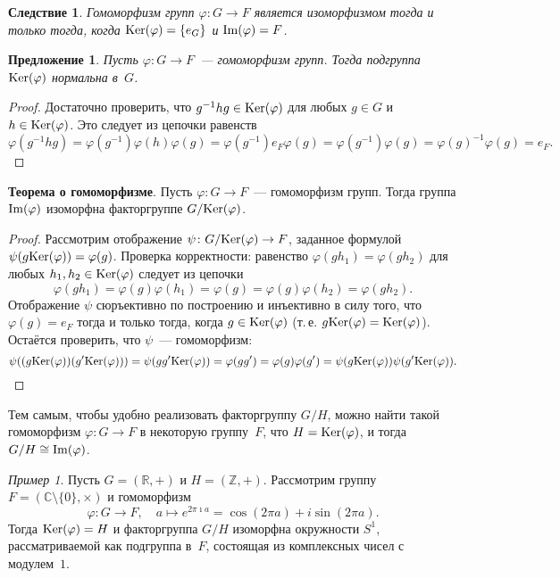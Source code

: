 \documentclass[a4paper,10pt]{amsart}
\def\Ker{{\rm Ker}}%
\def\Im{{\rm Im}}%
\def\CC{{\mathbb C}}%
\def\ZZ{{\mathbb Z}}%
\def\RR{{\mathbb R}}%
\newtheorem{proposition}{Предложение}
\newtheorem{corollary}{Следствие}
\theoremstyle{definition}
\theoremstyle{remark}
\newtheorem{example}{Пример}
\begin{document}
\begin{corollary}
Гомоморфизм групп $\varphi\colon G\to F$ является изоморфизмом тогда
и только тогда, когда $\Ker(\varphi)=\{e_G\}$ и $\Im(\varphi)=F$.
\end{corollary}

\begin{proposition}
Пусть $\varphi \colon G \to F$~--- гомоморфизм групп. Тогда
подгруппа $\Ker(\varphi)$ нормальна в~$G$.
\end{proposition}
\vspace{-3mm}
\begin{proof}
Достаточно проверить, что $g^{-1}hg \in \Ker(\varphi)$ для любых
$g\in G$ и $h \in \Ker(\varphi)$. Это следует из цепочки равенств
$$
\varphi(g^{-1}hg) = \varphi(g^{-1}) \varphi(h) \varphi(g) =
\varphi(g^{-1}) e_F \varphi(g) = \varphi(g^{-1}) \varphi(g) =
\varphi(g)^{-1} \varphi (g) = e_F.
$$
\end{proof}

{\bf Теорема о гомоморфизме}. Пусть $\varphi\colon G\to F$~---
гомоморфизм групп. Тогда группа $\Im(\varphi)$ изоморфна
факторгруппе $G/\Ker(\varphi)$.

\begin{proof}
Рассмотрим отображение $\psi \colon G / \Ker(\varphi) \to F$,
заданное формулой $\psi(g\Ker(\varphi)) = \varphi(g)$. Проверка
корректности: равенство $\varphi(gh_1)=\varphi(gh_2)$ для любых
$h_1,h_2\in\Ker(\varphi)$ следует из цепочки
$$
\varphi(gh_1)=\varphi(g)\varphi(h_1)=\varphi(g)=\varphi(g)\varphi(h_2)=\varphi(gh_2).
$$
Отображение $\psi$ сюръективно по построению и инъективно в силу
того, что $\varphi(g) = e_F$ тогда и только тогда, когда $g \in \Ker
(\varphi)$ (т.\,е. $g\Ker(\varphi) = \Ker(\varphi)$). Остаётся
проверить, что $\psi$~--- гомоморфизм:
$$
\psi((g\Ker(\varphi))(g'\Ker(\varphi))) = \psi(gg'\Ker(\varphi)) =
\varphi(gg') = \varphi(g)\varphi(g') =
\psi(g\Ker(\varphi))\psi(g'\Ker(\varphi)).
$$
\end{proof}

Тем самым, чтобы удобно реализовать факторгруппу $G/H$, можно найти
такой гомоморфизм $\varphi\colon G\to F$ в некоторую группу~$F$, что
$H = \Ker(\varphi)$, и тогда $G/H \cong \Im(\varphi)$.

\begin{example}
Пусть $G=(\RR,+)$ и $H=(\ZZ,+)$. Рассмотрим группу
$F=(\CC\setminus\{0\},\times)$ и гомоморфизм
$$
\varphi\colon G\to F, \quad a\mapsto e^{2\pi\imath a} = \cos (2\pi
a) + i \sin (2\pi a).
$$
Тогда $\Ker(\varphi)=H$ и факторгруппа $G/H$ изоморфна окружности
$S^1$, рассматриваемой как подгруппа в~$F$, состоящая из комплексных
чисел с модулем~$1$.
\end{example}
\end{document}
